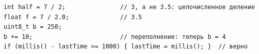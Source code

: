\begin{Verbatim}[fontsize=\small,bgcolor=codebg]
int half = 7 / 2;               // 3, а не 3.5: целочисленное деление
float f = 7 / 2.0;              // 3.5
uint8_t b = 250;
b += 10;                        // переполнение: теперь b = 4
if (millis() - lastTime >= 1000) { lastTime = millis(); }  // верно
\end{Verbatim}
